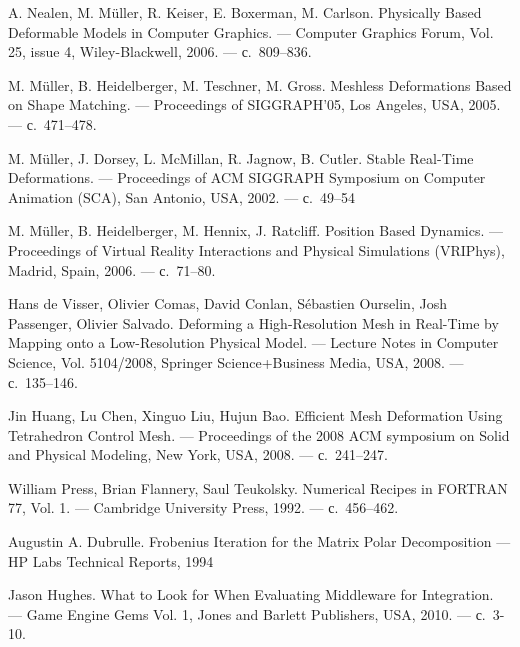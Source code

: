 \documentclass[a4paper,11pt]{report}
\begin{document}
  \begin{thebibliography}{9}

      A. Nealen, M. Müller, R. Keiser, E. Boxerman, M. Carlson.
      \newblock Physically Based Deformable Models in Computer Graphics.
      \newblock --- Computer Graphics Forum, Vol. 25, issue 4, Wiley-Blackwell, 2006.
      \newblock --- с.~809--836.

      M. Müller, B. Heidelberger, M. Teschner, M. Gross.
      \newblock Meshless Deformations Based on Shape Matching.
      \newblock --- Proceedings of SIGGRAPH'05, Los Angeles, USA, 2005.
      \newblock --- с.~471--478.

      M. Müller, J. Dorsey, L. McMillan, R. Jagnow, B. Cutler.
      \newblock Stable Real-Time Deformations.
      \newblock --- Proceedings of ACM SIGGRAPH Symposium on Computer Animation (SCA), San Antonio,
                    USA, 2002.
      \newblock --- с.~49--54

      M. Müller, B. Heidelberger, M. Hennix, J. Ratcliff.
      \newblock Position Based Dynamics.
      \newblock --- Proceedings of Virtual Reality Interactions and Physical Simulations (VRIPhys),
                    Madrid, Spain, 2006.
      \newblock --- с.~71--80.

      Hans de Visser, Olivier Comas, David Conlan, Sébastien Ourselin, Josh Passenger, Olivier Salvado.
      \newblock Deforming a High-Resolution Mesh in Real-Time by Mapping onto a Low-Resolution Physical Model.
      \newblock --- Lecture Notes in Computer Science, Vol. 5104/2008, Springer Science+Business Media,
                    USA, 2008.
      \newblock --- с.~135--146.

      Jin Huang, Lu Chen, Xinguo Liu, Hujun Bao.
      \newblock Efficient Mesh Deformation Using Tetrahedron Control Mesh.
      \newblock --- Proceedings of the 2008 ACM symposium on Solid and Physical Modeling, New York,
                    USA, 2008.
      \newblock --- с.~241--247.

      William Press, Brian Flannery, Saul Teukolsky.
      \newblock Numerical Recipes in FORTRAN 77, Vol. 1.
      \newblock --- Cambridge University Press, 1992.
      \newblock --- с.~456--462.

      Augustin A. Dubrulle.
      \newblock Frobenius Iteration for the Matrix Polar Decomposition
      \newblock --- HP Labs Technical Reports, 1994

      Jason Hughes.
      \newblock What to Look for When Evaluating Middleware for Integration.
      \newblock --- Game Engine Gems Vol. 1, Jones and Barlett Publishers, USA, 2010.
      \newblock --- с.~3-10.

  \end{thebibliography}
\end{document}
